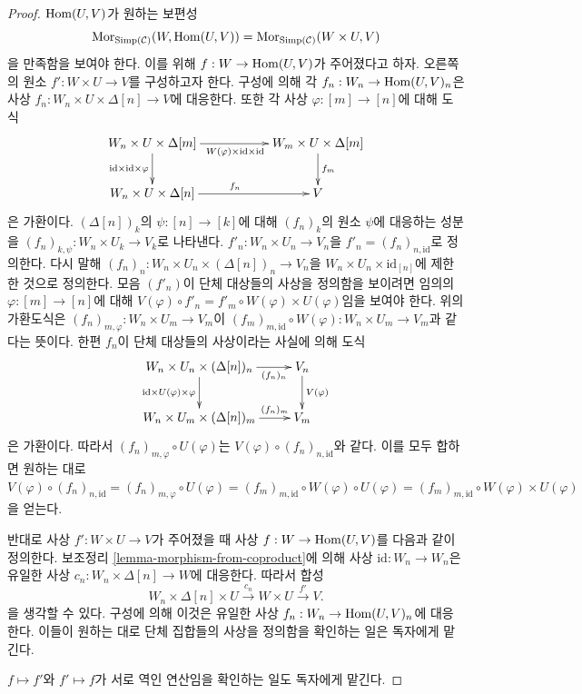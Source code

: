 \begin{proof}
\medskip\noindent
$\mathop{\mathrm{Hom}}\nolimits(U, V)$가 원하는 보편성
$$
\mathop{\mathrm{Mor}}\nolimits_{\text{Simp}(\mathcal{C})}(W, \mathop{\mathrm{Hom}}\nolimits(U, V))
=
\mathop{\mathrm{Mor}}\nolimits_{\text{Simp}(\mathcal{C})}(W \times U, V)
$$
을 만족함을 보여야 한다. 이를 위해 $f : W \to \mathop{\mathrm{Hom}}\nolimits(U, V)$가
주어졌다고 하자. 오른쪽의 원소 $f' : W \times U \to V$를
구성하고자 한다. 구성에 의해 각
$f_n : W_n \to \mathop{\mathrm{Hom}}\nolimits(U, V)_n$은 사상
$f_n : W_n \times U \times \Delta[n] \to V$에 대응한다.
또한 각 사상 $\varphi : [m] \to [n]$에 대해 도식
$$
\xymatrix{
W_n \times U \times \Delta[m]
\ar[rr]_{W(\varphi)\times \text{id} \times \text{id}}
\ar[d]_{\text{id} \times \text{id} \times \varphi} & &
W_m \times U \times \Delta[m] \ar[d]^{f_m} \\
W_n \times U \times \Delta[n] \ar[rr]^{f_n} & & V
}
$$
은 가환이다. $(\Delta[n])_k$의
$\psi : [n] \to [k]$에 대해 $(f_n)_k$의 원소 $\psi$에 대응하는
성분을 $(f_n)_{k, \psi} : W_n \times U_k \to V_k$로 나타낸다.
$f'_n : W_n \times U_n \to V_n$을
$f'_n = (f_n)_{n, \text{id}}$로 정의한다. 다시 말해
$(f_n)_n : W_n \times U_n \times (\Delta[n])_n \to V_n$을
$W_n \times U_n \times \text{id}_{[n]}$에 제한한 것으로 정의한다.
모음 $(f'_n)$이 단체 대상들의 사상을 정의함을 보이려면
임의의 $\varphi : [m] \to [n]$에 대해
$V(\varphi) \circ f'_n =
f'_m \circ W(\varphi) \times U(\varphi)$임을 보여야 한다.
위의 가환도식은
$(f_n)_{m, \varphi} : W_n \times U_m \to V_m$이
$(f_m)_{m, \text{id}} \circ W(\varphi) :
W_n \times U_m \to V_m$과 같다는 뜻이다.
한편 $f_n$이 단체 대상들의 사상이라는 사실에 의해 도식
$$
\xymatrix{
W_n \times U_n \times (\Delta[n])_n
\ar[r]_-{(f_n)_n}
\ar[d]_{\text{id} \times U(\varphi) \times \varphi}
& V_n \ar[d]^{V(\varphi)} \\
W_n \times U_m \times (\Delta[n])_m \ar[r]^-{(f_n)_m} & V_m
}
$$
은 가환이다. 따라서 $(f_n)_{m, \varphi} \circ U(\varphi)$는
$V(\varphi) \circ (f_n)_{n, \text{id}}$와 같다.
이를 모두 합하면 원하는 대로
$
V(\varphi) \circ (f_n)_{n, \text{id}}
=
(f_n)_{m, \varphi} \circ U(\varphi)
=
(f_m)_{m, \text{id}} \circ W(\varphi)\circ U(\varphi)
=
(f_m)_{m, \text{id}} \circ W(\varphi)\times U(\varphi)
$
을 얻는다.

\medskip\noindent
반대로 사상 $f' : W \times U \to V$가 주어졌을 때 사상
$f : W \to \mathop{\mathrm{Hom}}\nolimits(U, V)$를 다음과 같이 정의한다.
보조정리 \ref{lemma-morphism-from-coproduct}에 의해 사상
$\text{id} : W_n \to W_n$은 유일한 사상
$c_n : W_n \times \Delta[n] \to W$에 대응한다.
따라서 합성
$$
W_n \times \Delta[n] \times U
\xrightarrow{c_n}
W \times U
\xrightarrow{f'}
V.
$$
을 생각할 수 있다. 구성에 의해 이것은 유일한 사상
$f_n : W_n \to \mathop{\mathrm{Hom}}\nolimits(U, V)_n$에 대응한다.
이들이 원하는 대로 단체 집합들의 사상을 정의함을 확인하는 일은
독자에게 맡긴다.

\medskip\noindent
$f \mapsto f'$와 $f' \mapsto f$가 서로 역인 연산임을 확인하는 일도
독자에게 맡긴다.
\end{proof}

